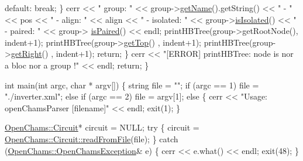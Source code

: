 \begin{DoxyCodeInclude}
            \textcolor{keywordflow}{default}:
                \textcolor{keywordflow}{break};
        \}
        cerr << \textcolor{stringliteral}{" group: "} << group->\hyperlink{class_open_chams_1_1_node_a3fd7335faa33dce2f87c7e50eef3e294}{getName}().getString() << \textcolor{stringliteral}{" - "} << pos << \textcolor{stringliteral}{" - align: "} << align 
      << \textcolor{stringliteral}{" - isolated: "} << group->\hyperlink{class_open_chams_1_1_group_ab5ae4a4550c418c974ff6e59967eeec2}{isIsolated}() << \textcolor{stringliteral}{" - paired: "} << group->
      \hyperlink{class_open_chams_1_1_group_aee0abf07a6e9d41f511c648e6eaecea3}{isPaired}() << endl; 
        printHBTree(group->getRootNode(), indent+1);
        printHBTree(group->\hyperlink{class_open_chams_1_1_node_af59967a8c2d5a04ca0a58e2ef29bead1}{getTop}()     , indent+1);
        printHBTree(group->\hyperlink{class_open_chams_1_1_node_a9533ddcf078ddfc2a4e9bd9ffafa51cb}{getRight}()   , indent+1);
        \textcolor{keywordflow}{return};
    \}
    cerr << \textcolor{stringliteral}{"[ERROR] printHBTree: node is nor a bloc nor a group !"} << endl;
    \textcolor{keywordflow}{return};
\}

\textcolor{keywordtype}{int} main(\textcolor{keywordtype}{int} argc, \textcolor{keywordtype}{char} * argv[]) \{
    \textcolor{keywordtype}{string} file = \textcolor{stringliteral}{""};
    \textcolor{keywordflow}{if} (argc == 1)
        file = \textcolor{stringliteral}{"./inverter.xml"};
    \textcolor{keywordflow}{else} \textcolor{keywordflow}{if} (argc == 2)
        file = argv[1];
    \textcolor{keywordflow}{else} \{
        cerr << \textcolor{stringliteral}{"Usage: openChamsParser [filename]"} << endl;
        exit(1);
    \}

    \hyperlink{class_open_chams_1_1_circuit}{OpenChams::Circuit}* circuit = NULL;
    \textcolor{keywordflow}{try} \{
        circuit = \hyperlink{class_open_chams_1_1_circuit_ad0aa3183bdea59e62f69c295026b7fe7}{OpenChams::Circuit::readFromFile}(file);
    \} \textcolor{keywordflow}{catch} (\hyperlink{class_open_chams_1_1_open_chams_exception}{OpenChams::OpenChamsException}& e) \{
        cerr << e.what() << endl;
        exit(48);
    \}


\end{DoxyCodeInclude}
